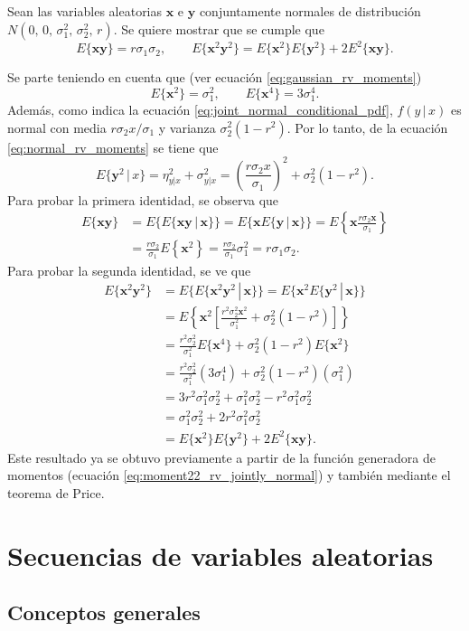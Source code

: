 \documentclass[a4paper]{report}
\newcommand{\x}{\mathbf{x}}
\newcommand{\y}{\mathbf{y}}
\begin{document}
Sean las variables aleatorias \(\x\) e \(\y\) conjuntamente normales de distribución \(N(0,\,0,\,\sigma_1^2,\,\sigma_2^2,\,r)\). Se quiere mostrar que se cumple que
\[
 E\{\x\y\}=r\sigma_1\sigma_2,\qquad E\{\x^2\y^2\}=E\{\x^2\}E\{\y^2\}+2E^2\{\x\y\}.
\]

Se parte teniendo en cuenta que (ver ecuación \ref{eq:gaussian_rv_moments})
\[
 E\{\x^2\}=\sigma_1^2,\qquad E\{\x^4\}=3\sigma_1^4.
\]
Además, como indica la ecuación \ref{eq:joint_normal_conditional_pdf}, \(f(y\,|\,x)\) es normal con media \(r\sigma_2x/\sigma_1\) y varianza \(\sigma_2^2(1-r^2)\). Por lo tanto, de la ecuación \ref{eq:normal_rv_moments} se tiene que
\[
 E\{\y^2\,|\,x\}=\eta_{y|x}^2+\sigma_{y|x}^2=\left(\frac{r\sigma_2x}{\sigma_1}\right)^2+\sigma_2^2(1-r^2).
\]
Para probar la primera identidad, se observa que
\begin{align*}
 E\{\x\y\}&=E\{E\{\x\y\,|\,\x\}\}=E\{\x E\{\y\,|\,\x\}\}=E\left\{\x\frac{r\sigma_2\x}{\sigma_1}\right\}\\
  &=\frac{r\sigma_2}{\sigma_1}E\left\{\x^2\right\}=\frac{r\sigma_2}{\sigma_1}\sigma_1^2
  =r\sigma_1\sigma_2.
\end{align*}
Para probar la segunda identidad, se ve que
\begin{align*}
 E\{\x^2\y^2\}&=E\{E\{\x^2\y^2\,|\,\x\}\}=E\{\x^2 E\{\y^2\,|\,\x\}\}\\
  &=E\left\{\x^2\left[\frac{r^2\sigma_2^2\x^2}{\sigma_1^2}+\sigma_2^2(1-r^2)\right]\right\}\\
  &=\frac{r^2\sigma_2^2}{\sigma_1^2}E\{\x^4\}+\sigma_2^2(1-r^2)E\{\x^2\}\\
  &=\frac{r^2\sigma_2^2}{\sigma_1^2}(3\sigma_1^4)+\sigma_2^2(1-r^2)(\sigma_1^2)\\
  &=3r^2\sigma_1^2\sigma_2^2+\sigma_1^2\sigma_2^2-r^2\sigma_1^2\sigma_2^2\\
  &=\sigma_1^2\sigma_2^2+2r^2\sigma_1^2\sigma_2^2\\
  &=E\{\x^2\}E\{\y^2\}+2E^2\{\x\y\}.
\end{align*}
Este resultado ya se obtuvo previamente a partir de la función generadora de momentos (ecuación \ref{eq:moment22_rv_jointly_normal}) y también mediante el teorema de Price.

\chapter{Secuencias de variables aleatorias}

\section{Conceptos generales}
\end{document}
